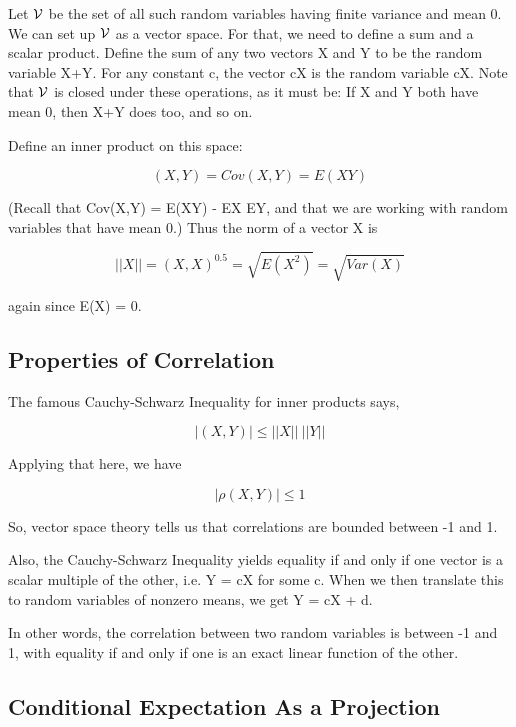 Let $\cal V$ be the set of all such random variables having finite
variance and mean 0.  We can set up $\cal V$ as a vector space.  For that,
we need to define a sum and a scalar product.  Define the sum of any two
vectors X and Y to be the random variable X+Y.  For any constant c, the
vector cX is the random variable cX.  Note that $\cal V$ is closed under
these operations, as it must be:  If X and Y both have mean 0, then X+Y
does too, and so on.

Define an inner product on this space:

\begin{equation}
(X,Y) = Cov(X,Y) = E(XY) 
\end{equation}

(Recall that Cov(X,Y) = E(XY) - EX EY, and that we are working with
random variables that have mean 0.) Thus the norm of a vector X is

\begin{equation}
||X|| = {(X,X)}^{0.5} = \sqrt{E(X^2)} = \sqrt{Var(X)}
\end{equation}

again since E(X) = 0.

\subsection{Properties of Correlation}
\label{propcorr}

The famous Cauchy-Schwarz Inequality for inner products says,

\begin{equation}
|(X,Y)| \leq ||X|| ~ ||Y||
\end{equation}

Applying that here, we have

\begin{equation}
|\rho(X,Y)| \leq 1
\end{equation}

So, vector space theory tells us that correlations are bounded between
-1 and 1.

Also, the Cauchy-Schwarz Inequality yields equality if and only if one
vector is a scalar multiple of the other, i.e. Y = cX for some c.
When we then translate this to random variables of nonzero means,
we get Y = cX + d.  

In other words, the correlation between two random variables is between
-1 and 1, with equality if and only if one is an exact linear function
of the other.

\subsection{Conditional Expectation As a Projection}
\label{elegant} 

